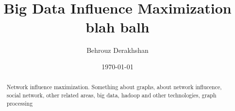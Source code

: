 \documentclass[english]{tktltiki}
\begin{document}
\onehalfspacing

\title{Big Data Influence Maximization blah balh}
\author{Behrouz Derakhshan}
\date{\today}

\maketitle



\begin{abstract}

Network influence maximization. Something about graphs, about network influcence, social network, other related areas, big data, hadoop and other technologies, graph processing

\end{abstract}

\mytableofcontents
\end{document}
